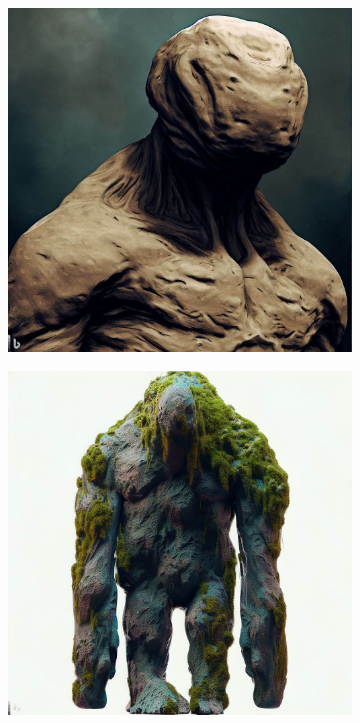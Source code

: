 \documentclass[11pt, twoside]{article}
\begin{document}
\begin{figure}[H]
\begin{subfigure}{0.3\textwidth}
    \includegraphics[width=0.99\linewidth]{golem2.jpeg}
  \end{subfigure}%
  \begin{subfigure}{0.3\textwidth}
    \centering
    \includegraphics[width=0.99\linewidth]{golem3.jpeg}
  \end{subfigure}
\end{figure}
\end{document}
